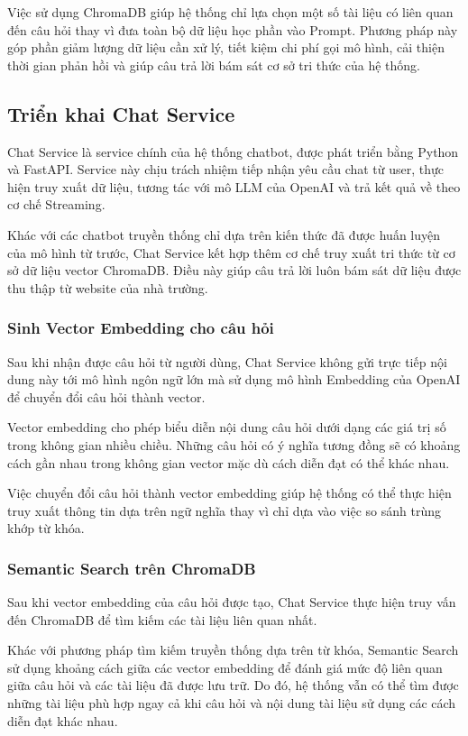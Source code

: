 \documentclass[../DoAn.tex]{subfiles}
\begin{document}
Việc sử dụng ChromaDB giúp hệ thống chỉ lựa chọn một số tài liệu có liên quan đến câu hỏi thay vì đưa toàn bộ dữ liệu học phần vào Prompt. Phương pháp này góp phần giảm lượng dữ liệu cần xử lý, tiết kiệm chi phí gọi mô hình, cải thiện thời gian phản hồi và giúp câu trả lời bám sát cơ sở tri thức của hệ thống.
\subsection{Triển khai Chat Service}
Chat Service là service chính của hệ thống chatbot, được phát triển bằng Python và FastAPI. Service này chịu trách nhiệm tiếp nhận yêu cầu chat từ user, thực hiện truy xuất dữ liệu, tương tác với mô LLM của OpenAI và trả kết quả về theo cơ chế Streaming.

Khác với các chatbot truyền thống chỉ dựa trên kiến thức đã được huấn luyện của mô hình từ trước, Chat Service kết hợp thêm cơ chế truy xuất tri thức từ cơ sở dữ liệu vector ChromaDB. Điều này giúp câu trả lời luôn bám sát dữ liệu được thu thập từ website của nhà trường.

\subsubsection{Sinh Vector Embedding cho câu hỏi}
Sau khi nhận được câu hỏi từ người dùng, Chat Service không gửi trực tiếp nội dung này tới mô hình ngôn ngữ lớn mà sử dụng mô hình Embedding của OpenAI để chuyển đổi câu hỏi thành vector.

Vector embedding cho phép biểu diễn nội dung câu hỏi dưới dạng các giá trị số trong không gian nhiều chiều. Những câu hỏi có ý nghĩa tương đồng sẽ có khoảng cách gần nhau trong không gian vector mặc dù cách diễn đạt có thể khác nhau.

Việc chuyển đổi câu hỏi thành vector embedding giúp hệ thống có thể thực hiện truy xuất thông tin dựa trên ngữ nghĩa thay vì chỉ dựa vào việc so sánh trùng khớp từ khóa.

\subsubsection{Semantic Search trên ChromaDB}
Sau khi vector embedding của câu hỏi được tạo, Chat Service thực hiện truy vấn đến ChromaDB để tìm kiếm các tài liệu liên quan nhất.

Khác với phương pháp tìm kiếm truyền thống dựa trên từ khóa, Semantic Search sử dụng khoảng cách giữa các vector embedding để đánh giá mức độ liên quan giữa câu hỏi và các tài liệu đã được lưu trữ. Do đó, hệ thống vẫn có thể tìm được những tài liệu phù hợp ngay cả khi câu hỏi và nội dung tài liệu sử dụng các cách diễn đạt khác nhau.
\end{document}
